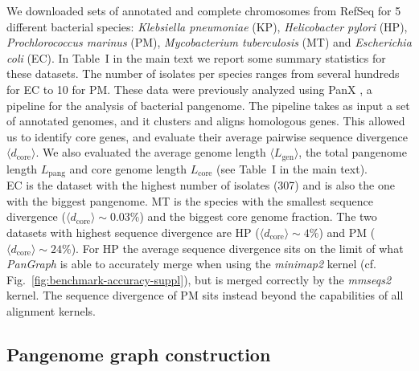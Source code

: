 \documentclass[aps,rmp,reprint,superscriptaddress,notitlepage,10pt,onecolumn]{revtex4-1}
\newcommand{\avg}[1]{\langle #1 \rangle}
\newcommand{\Lcore}{L_\text{core}}
\newcommand{\Lpang}{L_\text{pang}}
\newcommand{\Lgen}{L_\text{gen}}
\newcommand{\dcore}{\langle d_\text{core} \rangle}
\begin{document}
We downloaded sets of annotated and complete chromosomes from RefSeq \cite{o2016reference} for 5 different bacterial species: \textit{Klebsiella pneumoniae} (KP), \textit{Helicobacter pylori} (HP), \textit{Prochlorococcus marinus} (PM), \textit{Mycobacterium tuberculosis} (MT) and \textit{Escherichia coli} (EC). In Table~I in the main text we report some summary statistics for these datasets. The number of isolates per species ranges from several hundreds for EC to 10 for PM.
These data were previously analyzed using PanX \cite{ding2018panx}, a pipeline for the analysis of bacterial pangenome. The pipeline takes as input a set of annotated genomes, and it clusters and aligns homologous genes. This allowed us to identify core genes, and evaluate their average pairwise sequence divergence $\avg{d_\text{core}}$. We also evaluated the average genome length $\avg{\Lgen}$, the total pangenome length $\Lpang$ and core genome length $\Lcore$ (see Table~I in the main text).\\
EC is the dataset with the highest number of isolates (307) and is also the one with the biggest pangenome. MT is the species with the smallest sequence divergence ($\dcore \sim 0.03\%$) and the biggest core genome fraction. The two datasets with highest sequence divergence are HP ($\dcore \sim 4\%$) and PM ($\dcore \sim 24\%$). For HP the average sequence divergence sits on the limit of what \textit{PanGraph} is able to accurately merge when using the \textit{minimap2} kernel (cf. Fig.~\ref{fig:benchmark-accuracy-suppl}), but is merged correctly by the \textit{mmseqs2} kernel. The sequence divergence of PM sits instead beyond the capabilities of all alignment kernels.


\subsection{Pangenome graph construction}
\end{document}
